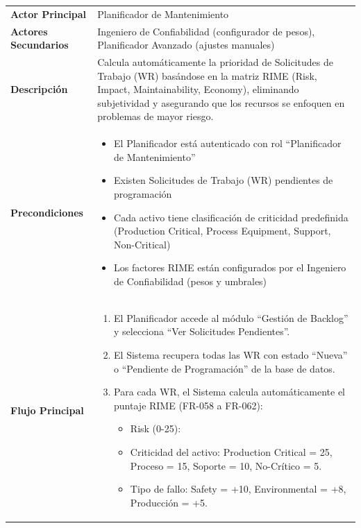 \begin{longtable}{>{\raggedright\arraybackslash}p{0.21\textwidth} >{\raggedright\arraybackslash}p{0.74\textwidth}} \toprule
\textbf{Actor Principal} & Planificador de Mantenimiento \\
\textbf{Actores Secundarios} & Ingeniero de Confiabilidad (configurador de pesos), Planificador Avanzado (ajustes manuales) \\
\textbf{Descripción} & Calcula automáticamente la prioridad de Solicitudes de Trabajo (WR) basándose en la matriz RIME (Risk, Impact, Maintainability, Economy), eliminando subjetividad y asegurando que los recursos se enfoquen en problemas de mayor riesgo. \\
\textbf{Precondiciones} & \parbox[t]{\linewidth}{\vspace{2pt} \begin{itemize}[leftmargin=1.5em, nosep, topsep=0pt]
\item El Planificador está autenticado con rol ``Planificador de Mantenimiento''
\item Existen Solicitudes de Trabajo (WR) pendientes de programación
\item Cada activo tiene clasificación de criticidad predefinida (Production Critical, Process Equipment, Support, Non-Critical)
\item Los factores RIME están configurados por el Ingeniero de Confiabilidad (pesos y umbrales)
\end{itemize} \vspace{2pt}} \\
\textbf{Flujo Principal} & \parbox[t]{\linewidth}{\vspace{2pt} \begin{enumerate}[leftmargin=1.5em, nosep, topsep=0pt]
\item El Planificador accede al módulo ``Gestión de Backlog'' y selecciona ``Ver Solicitudes Pendientes''.
\item El Sistema recupera todas las WR con estado ``Nueva'' o ``Pendiente de Programación'' de la base de datos.
\item Para cada WR, el Sistema calcula automáticamente el puntaje RIME (FR-058 a FR-062):
\begin{itemize}[leftmargin=1.2em, nosep, topsep=0pt]
\item Risk (0-25):
\item Criticidad del activo: Production Critical = 25, Proceso = 15, Soporte = 10, No-Crítico = 5.
\item Tipo de fallo: Safety = +10, Environmental = +8, Producción = +5.

\end{itemize}
\end{enumerate}}
\end{longtable}
